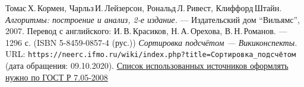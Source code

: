 \begin{thebibliography}{99}
    Томас\,Х.\,Кормен, Чарльз\,И.\,Лейзерсон, Рональд\,Л.\,Ривест, Клиффорд\,Штайн.
    {\itshape Алгоритмы: построение и анализ, 2-е издание.} --- Издательский дом \enquote{Вильямс}, 2007. Перевод с английского: И.\,В.\,Красиков, Н.\,А.\,Орехова, В.\,Н.\,Романов. --- 1296 с. (ISBN 5-8459-0857-4 (рус.))
    {\itshape Сортировка подсчётом — Викиконспекты.} \\URL: \texttt{https://neerc.ifmo.ru/wiki/index.php?title=Сортировка\_подсчётом} (дата обращения: 09.10.2020).
    \href{http://www.ifap.ru/library/gost/7052008.pdf}{Список использованных источников оформлять нужно по  ГОСТ Р 7.05-2008}
    \end{thebibliography}
    \pagebreak